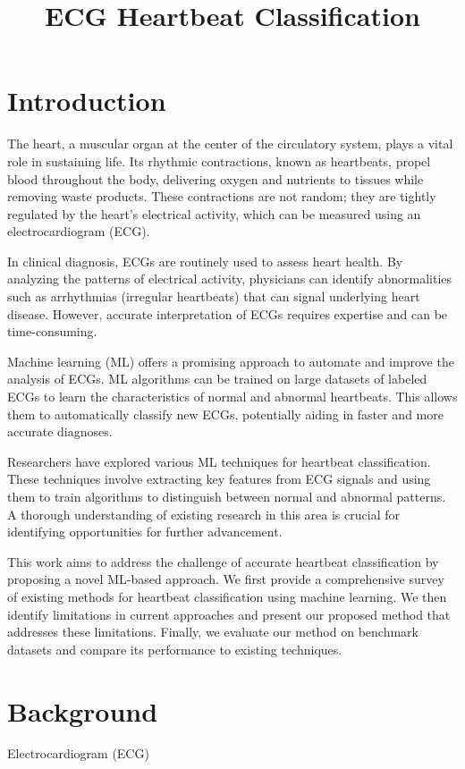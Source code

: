 \documentclass[conference]{IEEEtran}
\title{ECG Heartbeat Classification}
\begin{document}
\maketitle

\section{Introduction}

The heart, a muscular organ at the center of the circulatory system, plays a vital role in sustaining life. Its rhythmic contractions, known as heartbeats, propel blood throughout the body, delivering oxygen and nutrients to tissues while removing waste products.  These contractions are not random; they are tightly regulated by the heart's electrical activity, which can be measured using an electrocardiogram (ECG). 

In clinical diagnosis, ECGs are routinely used to assess heart health. By analyzing the patterns of electrical activity, physicians can identify abnormalities such as arrhythmias (irregular heartbeats) that can signal underlying heart disease. However, accurate interpretation of ECGs requires expertise and can be time-consuming.

Machine learning (ML) offers a promising approach to automate and improve the analysis of ECGs. ML algorithms can be trained on large datasets of labeled ECGs to learn the characteristics of normal and abnormal heartbeats.  This allows them to automatically classify new ECGs, potentially aiding in faster and more accurate diagnoses.

Researchers have explored various ML techniques for heartbeat classification. These techniques involve extracting key features from ECG signals and using them to train algorithms to distinguish between normal and abnormal patterns. A  thorough understanding of existing research in this area is crucial for identifying opportunities for further advancement.

This work aims to address the challenge of accurate heartbeat classification by proposing a novel ML-based approach.  We first provide a comprehensive survey of existing methods for heartbeat classification using machine learning. We then identify limitations in current approaches and present our proposed method that addresses these limitations.  Finally, we evaluate our method on benchmark datasets and compare its performance to existing techniques. 

\section{Background}
Electrocardiogram (ECG)
\end{document}
